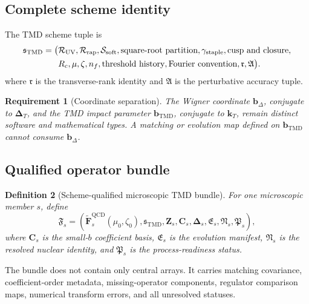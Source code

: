\documentclass[11pt]{article}
\newtheorem{definition}{Definition}[section]
\newtheorem{requirement}[definition]{Requirement}
\newcommand{\QCD}{\mathrm{QCD}}
\newcommand{\TMD}{\mathrm{TMD}}
\newcommand{\bD}{\bm b_{\Delta}}
\newcommand{\bM}{\bm b_{\mathrm{TMD}}}
\newcommand{\kT}{\bm k_T}
\newcommand{\DT}{\bm\Delta_T}
\newcommand{\cR}{\mathcal R}
\newcommand{\cS}{\mathcal S}
\begin{document}
\subsection{Complete scheme identity}

The TMD scheme tuple is
\begin{equation}
 \begin{aligned}
 \mathfrak s_{\TMD}=\bigl(&
 \cR_{\rm UV},\cR_{\rm rap},\cS_{\rm soft},
 \text{square-root partition},
 \gamma_{\rm staple},
 \text{cusp and closure},\notag\\
 &R_c,\mu,\zeta,n_f,
 \text{threshold history},
 \text{Fourier convention},
 \mathfrak r,\mathfrak A\bigr).
 \end{aligned}
 \label{eq:scheme-tuple}
\end{equation}
where \(\mathfrak r\) is the transverse-rank identity and \(\mathfrak A\) is the perturbative accuracy tuple.

\begin{requirement}[Coordinate separation]
The Wigner coordinate \(\bD\), conjugate to \(\DT\), and the TMD impact parameter \(\bM\), conjugate to \(\kT\), remain distinct software and mathematical types.  A matching or evolution map defined on \(\bM\) cannot consume \(\bD\).
\end{requirement}

\subsection{Qualified operator bundle}

\begin{definition}[Scheme-qualified microscopic TMD bundle]
For one microscopic member \(s\), define
\begin{equation}
 \mathfrak F_s=
 \left(
 \widetilde{\bm F}^{\QCD}_{s}(\mu_0,\zeta_0),
 \mathfrak s_{\TMD},
 \bm Z_s,
 \bm C_s,
 \bm\Delta_s,
 \mathfrak E_s,
 \mathfrak N_s,
 \mathfrak P_s
 \right),
 \label{eq:qualified-bundle}
\end{equation}
where \(\bm C_s\) is the small-\(b\) coefficient basis, \(\mathfrak E_s\) is the evolution manifest, \(\mathfrak N_s\) is the resolved nuclear identity, and \(\mathfrak P_s\) is the process-readiness status.
\end{definition}

The bundle does not contain only central arrays.  It carries matching covariance, coefficient-order metadata, missing-operator components, regulator comparison maps, numerical transform errors, and all unresolved statuses.
\end{document}
